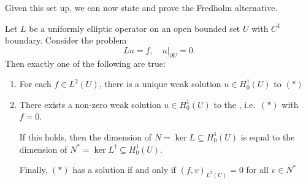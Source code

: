 \documentclass[a4paper]{article}
\begin{document}
Given this set up, we can now state and prove the Fredholm alternative.
\begin{thm}
  Let $L$ be a uniformly elliptic operator on an open bounded set $U$ with $C^1$ boundary. Consider the problem
  \[
    Lu = f,\quad u|_{\partial U} = 0.\tag{$*$}
  \]
  Then exactly one of the following are true:
  \begin{enumerate}
    \item For each $f \in L^2(U)$, there is a unique weak solution $u \in H_0^1(U)$ to $(*)$
    \item There exists a non-zero weak solution $u \in H_0^1(U)$ to the , i.e.\ $(*)$ with $f = 0$.

      If this holds, then the dimension of $N = \ker L \subseteq H_0^1(U)$ is equal to the dimension of $N^* = \ker L^\dagger \subseteq H_0^1(U)$.

      Finally, $(*)$ has a solution if and only if $(f, v)_{L^2(U)} = 0$ for all $v \in N^*$
  \end{enumerate}
\end{thm}
\end{document}
